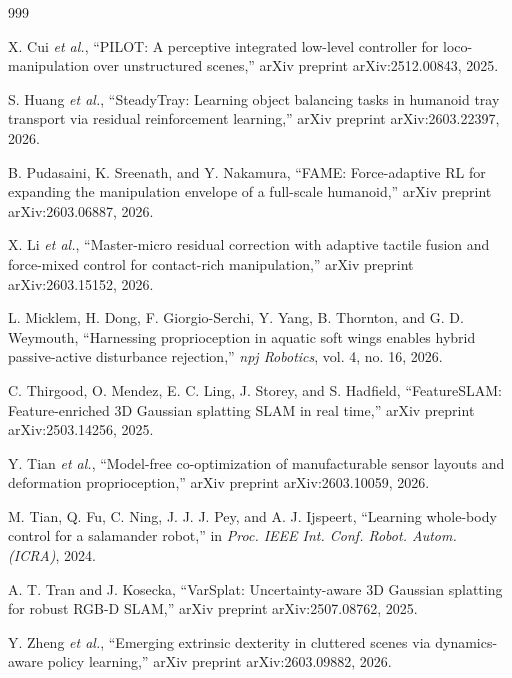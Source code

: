 \documentclass[12pt,a4paper,oneside]{report}
\begin{document}
\begin{thebibliography}{999}

X. Cui \textit{et al.}, ``{PILOT}: A perceptive integrated low-level controller for loco-manipulation over unstructured scenes,'' arXiv preprint arXiv:2512.00843, 2025.




S. Huang \textit{et al.}, ``{SteadyTray}: Learning object balancing tasks in humanoid tray transport via residual reinforcement learning,'' arXiv preprint arXiv:2603.22397, 2026.




B. Pudasaini, K. Sreenath, and Y. Nakamura, ``{FAME}: Force-adaptive RL for expanding the manipulation envelope of a full-scale humanoid,'' arXiv preprint arXiv:2603.06887, 2026.




X. Li \textit{et al.}, ``Master-micro residual correction with adaptive tactile fusion and force-mixed control for contact-rich manipulation,'' arXiv preprint arXiv:2603.15152, 2026.




L. Micklem, H. Dong, F. Giorgio-Serchi, Y. Yang, B. Thornton, and G. D. Weymouth, ``Harnessing proprioception in aquatic soft wings enables hybrid passive-active disturbance rejection,'' \textit{npj Robotics}, vol. 4, no. 16, 2026.




C. Thirgood, O. Mendez, E. C. Ling, J. Storey, and S. Hadfield, ``{FeatureSLAM}: Feature-enriched {3D} Gaussian splatting {SLAM} in real time,'' arXiv preprint arXiv:2503.14256, 2025.




Y. Tian \textit{et al.}, ``Model-free co-optimization of manufacturable sensor layouts and deformation proprioception,'' arXiv preprint arXiv:2603.10059, 2026.




M. Tian, Q. Fu, C. Ning, J. J. J. Pey, and A. J. Ijspeert, ``Learning whole-body control for a salamander robot,'' in \textit{Proc. IEEE Int. Conf. Robot. Autom. (ICRA)}, 2024.




A. T. Tran and J. Kosecka, ``{VarSplat}: Uncertainty-aware {3D} Gaussian splatting for robust {RGB-D} {SLAM},'' arXiv preprint arXiv:2507.08762, 2025.




Y. Zheng \textit{et al.}, ``Emerging extrinsic dexterity in cluttered scenes via dynamics-aware policy learning,'' arXiv preprint arXiv:2603.09882, 2026.



\end{thebibliography}
\end{document}
